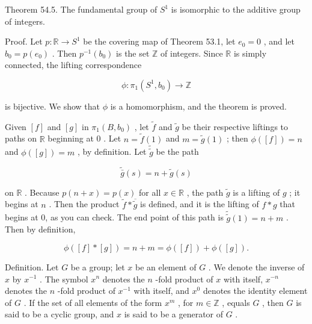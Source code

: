 Theorem 54.5. The fundamental group of \({S}^{1}\) is isomorphic to the additive group of integers.

Proof. Let \(p : \mathbb{R} \rightarrow  {S}^{1}\) be the covering map of Theorem 53.1, let \({e}_{0} = 0\) , and let \({b}_{0} = p\left( {e}_{0}\right)\) . Then \({p}^{-1}\left( {b}_{0}\right)\) is the set \(\mathbb{Z}\) of integers. Since \(\mathbb{R}\) is simply connected, the lifting correspondence

\[
\phi  : {\pi }_{1}\left( {{S}^{1},{b}_{0}}\right)  \rightarrow  \mathbb{Z}
\]

is bijective. We show that \(\phi\) is a homomorphism, and the theorem is proved.

Given \(\left\lbrack  f\right\rbrack\) and \(\left\lbrack  g\right\rbrack\) in \({\pi }_{1}\left( {B,{b}_{0}}\right)\) , let \(\widetilde{f}\) and \(\widetilde{g}\) be their respective liftings to paths on \(\mathbb{R}\) beginning at 0 . Let \(n = \widetilde{f}\left( 1\right)\) and \(m = \widetilde{g}\left( 1\right)\) ; then \(\phi \left( \left\lbrack  f\right\rbrack  \right)  = n\) and \(\phi \left( \left\lbrack  g\right\rbrack  \right)  = m\) , by definition. Let \(\widetilde{\widetilde{g}}\) be the path

\[
\widetilde{\bar{g}}\left( s\right)  = n + \widetilde{g}\left( s\right)
\]

on \(\mathbb{R}\) . Because \(p\left( {n + x}\right)  = p\left( x\right)\) for all \(x \in  \mathbb{R}\) , the path \(\widetilde{g}\) is a lifting of \(g\) ; it begins at \(n\) . Then the product \(\widetilde{f} * \overline{\widetilde{g}}\) is defined, and it is the lifting of \(f * g\) that begins at 0, as you can check. The end point of this path is \(\widetilde{\widetilde{g}}\left( 1\right)  = n + m\) . Then by definition,

\[
\phi \left( {\left\lbrack  f\right\rbrack   * \left\lbrack  g\right\rbrack  }\right)  = n + m = \phi \left( \left\lbrack  f\right\rbrack  \right)  + \phi \left( \left\lbrack  g\right\rbrack  \right) .
\]

Definition. Let \(G\) be a group; let \(x\) be an element of \(G\) . We denote the inverse of \(x\) by \({x}^{-1}\) . The symbol \({x}^{n}\) denotes the \(n\) -fold product of \(x\) with itself, \({x}^{-n}\) denotes the \(n\) -fold product of \({x}^{-1}\) with itself, and \({x}^{0}\) denotes the identity element of \(G\) . If the set of all elements of the form \({x}^{m}\) , for \(m \in  \mathbb{Z}\) , equals \(G\) , then \(G\) is said to be a cyclic group, and \(x\) is said to be a generator of \(G\) .

